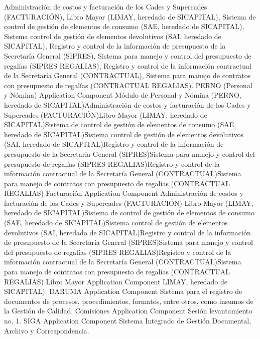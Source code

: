 \documentclass[
	a4paper, %
	12pt, %
]{include/CSSullivanBusinessReport}
\begin{document}
Administración de costos y facturación de los Cades y Supercades
(FACTURACIÓN), Libro Mayor (LIMAY, heredado de SICAPITAL), Sistema de
control de gestión de elementos de consumo (SAE, heredado de SICAPITAL),
Sistema control de gestión de elementos devolutivos (SAI, heredado de
SICAPITAL), Registro y control de la información de presupuesto de la
Secretaría General (SIPRES), Sistema para manejo y control del
presupuesto de regalías (SIPRES REGALIAS), Registro y control de la
información contractual de la Secretaría General (CONTRACTUAL), Sistema
para manejo de contratos con presupuesto de regalías (CONTRACTUAL
REGALIAS). \textbar{} \textbar{} PERNO (Personal y Nómina) \textbar{}
Application Component \textbar{} Módulo de Personal y Nómina (PERNO,
heredado de SICAPITAL)Administración de costos y facturación de los
Cades y Supercades (FACTURACIÓN)Libro Mayor (LIMAY, heredado de
SICAPITAL)Sistema de control de gestión de elementos de consumo (SAE,
heredado de SICAPITAL)Sistema control de gestión de elementos
devolutivos (SAI, heredado de SICAPITAL)Registro y control de la
información de presupuesto de la Secretaría General (SIPRES)Sistema para
manejo y control del presupuesto de regalías (SIPRES REGALIAS)Registro y
control de la información contractual de la Secretaría General
(CONTRACTUAL)Sistema para manejo de contratos con presupuesto de
regalías (CONTRACTUAL REGALIAS) \textbar{} \textbar{} Facturación
\textbar{} Application Component \textbar{} Administración de costos y
facturación de los Cades y Supercades (FACTURACIÓN) Libro Mayor (LIMAY,
heredado de SICAPITAL)Sistema de control de gestión de elementos de
consumo (SAE, heredado de SICAPITAL)Sistema control de gestión de
elementos devolutivos (SAI, heredado de SICAPITAL)Registro y control de
la información de presupuesto de la Secretaría General (SIPRES)Sistema
para manejo y control del presupuesto de regalías (SIPRES
REGALIAS)Registro y control de la información contractual de la
Secretaría General (CONTRACTUAL)Sistema para manejo de contratos con
presupuesto de regalías (CONTRACTUAL REGALIAS) \textbar{} \textbar{}
Libro Mayor \textbar{} Application Component \textbar{} LIMAY, heredado
de SICAPITAL). \textbar{} \textbar{} DARUMA \textbar{} Application
Component \textbar{} Sistema para el registro de documentos de procesos,
procedimientos, formatos, entre otros, como insumos de la Gestión de
Calidad. \textbar{} \textbar{} Comisiones \textbar{} Application
Component \textbar{} Sesión levantamiento no. 1. \textbar{} \textbar{}
SIGA \textbar{} Application Component \textbar{} Sistema Integrado de
Gestión Documental, Archivo y Correspondencia. \textbar{} \textbar{}
\end{document}
